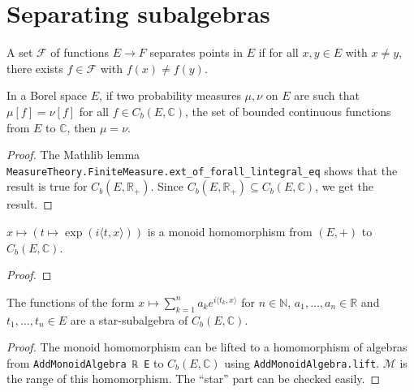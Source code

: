 \chapter{Separating subalgebras}

\begin{definition}\label{def:separates_points}
\mathlibok
{}
A set $\mathcal F$ of functions $E \to F$ separates points in $E$ if for all $x, y \in E$ with $x \ne y$, there exists $f \in \mathcal F$ with $f(x) \ne f(y)$.
\end{definition}


\begin{lemma}\label{lem:bounded_continuous_separating}
\mathlibok
{}
In a Borel space $E$, if two probability measures $\mu, \nu$ on $E$ are such that $\mu[f] = \nu[f]$ for all $f \in C_b(E, \mathbb{C})$, the set of bounded continuous functions from $E$ to $\mathbb{C}$, then $\mu = \nu$.
\end{lemma}

\begin{proof}\leanok
The Mathlib lemma \texttt{MeasureTheory.FiniteMeasure.ext\_of\_forall\_lintegral\_eq} shows that the result is true for $C_b(E, \mathbb{R}_+)$. Since $C_b(E, \mathbb{R}_{+}) \subseteq C_b(E, \mathbb{C})$, we get the result.
\end{proof}


\begin{lemma}\label{lem:exp_character}
\mathlibok
{}
$x \mapsto (t \mapsto \exp(i \langle t, x \rangle))$ is a monoid homomorphism from $(E,+)$ to $C_b(E, \mathbb{C})$.
\end{lemma}

\begin{proof}\leanok
\end{proof}


\begin{lemma}\label{lem:starSubalgebra_expPoly}
\mathlibok
{}
The functions of the form $x \mapsto \sum_{k=1}^n a_k e^{i\langle t_k, x\rangle}$ for $n \in \mathbb{N}$, $a_1, \ldots, a_n \in \mathbb{R}$ and $t_1, \ldots, t_n \in E$ are a star-subalgebra of $C_b(E, \mathbb{C})$. 
\end{lemma}

\begin{proof} \leanok
The monoid homomorphism can be lifted to a homomorphism of algebras from \texttt{AddMonoidAlgebra ℝ E} to $C_b(E, \mathbb{C})$ using \texttt{AddMonoidAlgebra.lift}. $\mathcal M$ is the range of this homomorphism. The ``star'' part can be checked easily.
\end{proof}


